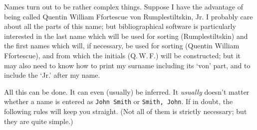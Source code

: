 {Names turn out to be rather complex things. Suppose I have the advantage of being called Quentin William Ffortescue von Rumplestiltskin, Jr. I probably care about all the parts of this name; but bibliographical software is particularly interested in the last name which will be used for sorting (Rumplestiltskin) and the first names which will, if necessary, be used for sorting (Quentin William Ffortescue), and from which the initials (Q.\,W.\,F.) will be constructed; but it may also need to know how to print my surname including its `von' part, and to include the `Jr.' after my name.

All this can be done. It can even (usually) be inferred. It \emph{usually} doesn't matter whether a name is entered as \verb|John Smith| or \verb|Smith, John|. If in doubt, the following rules will keep you straight. (Not all of them is strictly necessary; but they are quite simple.)

}
